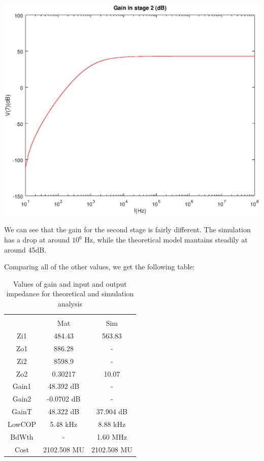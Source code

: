 \hspace{1mm}
\begin{minipage}[c]{0.50\linewidth}
\includegraphics[width=1\linewidth]{vo2.eps}
\end{minipage}

We can see that the gain for the second stage is fairly different. The simulation has a drop at around $10^6$ Hz, while the theoretical model mantains steadily at around 45dB.

Comparing all of the other values, we get the following table: 


\begin{table}[H]
\addtolength{\tabcolsep}{-4pt}
\caption{Values of gain and input and output impedance for theoretical and simulation analysis}
\vspace{-3mm}
\begin{tabular}{|c|c|c|}
\hline\\
 &	Mat &	Sim\\

Zi1 &484.43 &	563.83 \\

Zo1&886.28 	&-\\

Zi2&	8598.9 	&-\\

Zo2&	0.30217 &	10.07 \\

Gain1&	48.392 dB	&-\\

Gain2&	-0.0702 dB&-\\	

GainT&	48.322 dB	&37.904 dB\\

LowCOP&	5.48 kHz&	8.88 kHz\\

BdWth	&-	&1.60 MHz\\

Cost	&2102.508 MU&	2102.508 MU\\
\hline
\end{tabular}
\label{tab:Comparison}
\end{table}

